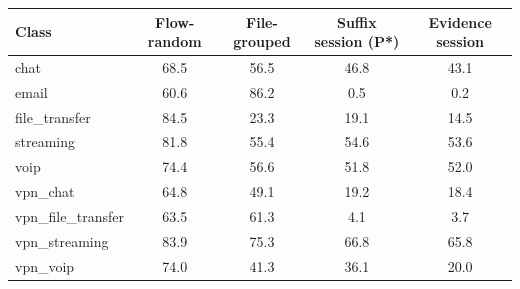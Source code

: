 \begin{tabular}{lcccc}
\toprule
Class & Flow-random & File-grouped & Suffix session (P*) & Evidence session \\
\midrule
chat & 68.5 & 56.5 & 46.8 & 43.1 \\
email & 60.6 & 86.2 & 0.5 & 0.2 \\
file\_transfer & 84.5 & 23.3 & 19.1 & 14.5 \\
streaming & 81.8 & 55.4 & 54.6 & 53.6 \\
voip & 74.4 & 56.6 & 51.8 & 52.0 \\
vpn\_chat & 64.8 & 49.1 & 19.2 & 18.4 \\
vpn\_file\_transfer & 63.5 & 61.3 & 4.1 & 3.7 \\
vpn\_streaming & 83.9 & 75.3 & 66.8 & 65.8 \\
vpn\_voip & 74.0 & 41.3 & 36.1 & 20.0 \\
\bottomrule
\end{tabular}
